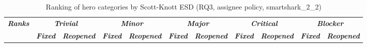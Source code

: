 \begin{table}[htbp]
    \centering
    \scriptsize
    \caption{Ranking of hero categories by Scott-Knott ESD (RQ3, assignee policy, smartshark\_2\_2)}
    \label{tab:rq3-herorank-assignee}
    \begin{adjustbox}{max width=\textwidth}
        \begin{tabular}{|c|cc|cc|cc|cc|cc|}
            \hline
            \multirow{2}{*}{\textit{\textbf{Ranks}}} & \multicolumn{2}{c|}{\textit{\textbf{Trivial}}} & \multicolumn{2}{c|}{\textit{\textbf{Minor}}} & \multicolumn{2}{c|}{\textit{\textbf{Major}}} & \multicolumn{2}{c|}{\textit{\textbf{Critical}}} & \multicolumn{2}{c|}{\textit{\textbf{Blocker}}} \\ \cline{2-11}
            & \multicolumn{1}{c|}{\textit{\textbf{Fixed}}} & \textit{\textbf{Reopened}} & \multicolumn{1}{c|}{\textit{\textbf{Fixed}}} & \textit{\textbf{Reopened}} & \multicolumn{1}{c|}{\textit{\textbf{Fixed}}} & \textit{\textbf{Reopened}} & \multicolumn{1}{c|}{\textit{\textbf{Fixed}}} & \textit{\textbf{Reopened}} & \multicolumn{1}{c|}{\textit{\textbf{Fixed}}} & \textit{\textbf{Reopened}} \\ \hline

\end{tabular}
\end{adjustbox}
\end{table}
